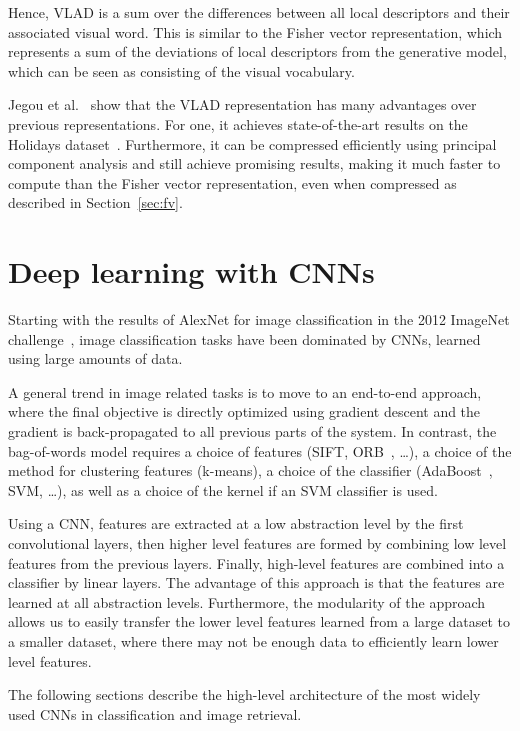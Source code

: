 Hence, VLAD is a sum over the differences between all local descriptors
and their associated visual word. This is similar to the Fisher vector
representation, which represents a sum of the deviations of local
descriptors from the generative model, which can be seen as consisting
of the visual vocabulary.

Jegou et al.~\cite{jegou_aggregating_2010} show that the VLAD representation
has many advantages over previous representations. For one, it achieves
state-of-the-art results on the Holidays dataset~\cite{jegou_hamming_2008}.
Furthermore, it can be compressed efficiently using principal component
analysis and still achieve promising results, making it much faster to
compute than the Fisher vector representation, even when compressed
as described in Section~\ref{sec:fv}.

\section{Deep learning with CNNs}
Starting with the results of AlexNet for image classification in the 2012
ImageNet challenge~\cite{krizhevsky_imagenet_2012,russakovsky_imagenet_2015},
image classification tasks have been dominated by CNNs, learned using
large amounts of data.

A general trend in image related tasks is to move to an end-to-end
approach, where the final objective is directly optimized using gradient
descent and the gradient is back-propagated to all previous parts of the
system. In contrast, the bag-of-words model requires a choice of
features (SIFT, ORB~\cite{rublee_orb:_2011}, \dots),
a choice of the method for clustering features (k-means),
a choice of the classifier (AdaBoost~\cite{freund_desicion-theoretic_1995},
SVM, \dots), as well as a choice of the kernel if an SVM classifier is used.

Using a CNN, features are extracted at a low abstraction level by the
first convolutional layers, then higher level features are formed
by combining low level features from the previous layers. Finally,
high-level features are combined into a classifier by linear layers.
The advantage of this approach is that the features are learned at all
abstraction levels. Furthermore, the modularity of the approach allows
us to easily transfer the lower level features learned from a large dataset
to a smaller dataset, where there may not be enough data to efficiently
learn lower level features.

The following sections describe the high-level architecture of the
most widely used CNNs in classification and image retrieval.
